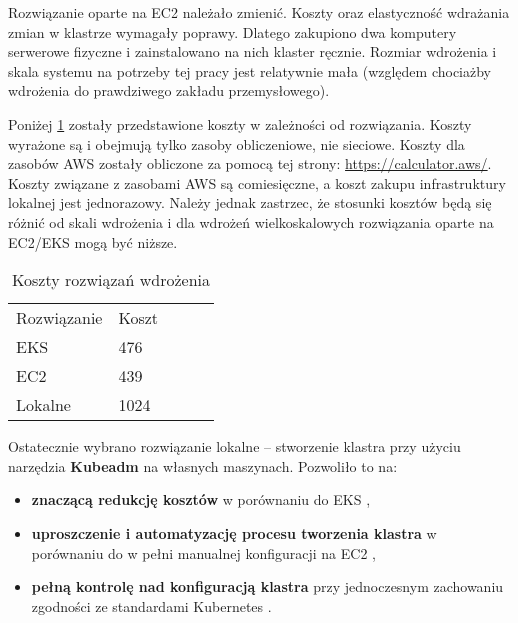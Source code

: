 Rozwiązanie oparte na EC2 należało zmienić. Koszty oraz elastyczność wdrażania zmian w klastrze wymagały poprawy. Dlatego zakupiono dwa komputery serwerowe fizyczne i zainstalowano na nich klaster ręcznie. Rozmiar wdrożenia i skala systemu na potrzeby tej pracy jest relatywnie mała (względem chociażby wdrożenia do prawdziwego zakładu przemysłowego).

Poniżej \ref{tab:koszty_rozwiazan_wdrazenia} zostały przedstawione koszty w zależności od rozwiązania. Koszty wyrażone są i obejmują tylko zasoby obliczeniowe, nie sieciowe. Koszty dla zasobów AWS zostały obliczone za pomocą tej strony: \url{https://calculator.aws/}. Koszty związane z zasobami AWS są comiesięczne, a koszt zakupu infrastruktury lokalnej jest jednorazowy. Należy jednak zastrzec, że stosunki kosztów będą się różnić od skali wdrożenia i dla wdrożeń wielkoskalowych rozwiązania oparte na EC2/EKS mogą być niższe.

\begin{table}[h]
    \centering
    \begin{tabular}{|l|l|lll}
    \cline{1-2}
    Rozwiązanie & Koszt &  &  &  \\ \cline{1-2}
    EKS         & 476   &  &  &  \\ \cline{1-2}
    EC2         & 439   &  &  &  \\ \cline{1-2}
    Lokalne     & 1024  &  &  &  \\ \cline{1-2}
    \end{tabular}
    \caption{Koszty rozwiązań wdrożenia}
    \label{tab:koszty_rozwiazan_wdrazenia}
\end{table}

\vspace{0.3em}

Ostatecznie wybrano rozwiązanie lokalne – stworzenie klastra przy użyciu narzędzia \textbf{Kubeadm} \cite{kubeadm_docs} na własnych maszynach. Pozwoliło to na:
\begin{itemize}
    \item \textbf{znaczącą redukcję kosztów} w porównaniu do EKS \cite{eks_docs},
    \item \textbf{uproszczenie i automatyzację procesu tworzenia klastra} w porównaniu do w pełni manualnej konfiguracji na EC2 \cite{ec2_docs},
    \item \textbf{pełną kontrolę nad konfiguracją klastra} przy jednoczesnym zachowaniu zgodności ze standardami Kubernetes \cite{kubernetes}.
\end{itemize}

